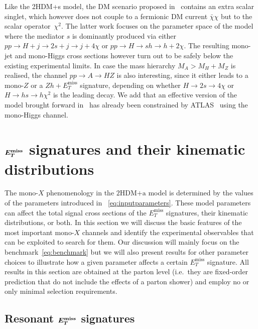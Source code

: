 \documentclass[a4paper, 11pt,notoc]{article}
\newcommand{\MET}{\ensuremath{E_T^\mathrm{miss}}\xspace}
\newcommand{\hdma}{\ensuremath{\textrm{2HDM+a}}\xspace}
\def\bm#1{\mbox{\boldmath$#1$\unboldmath}}
\begin{document}
{\color{blue} Like the 2HDM+s model, the DM scenario proposed in~\cite{vonBuddenbrock:2016rmr} contains an extra scalar singlet, which however does not couple to a fermionic DM current $\bar \chi \chi$ but to the scalar operator~$\chi^2$.} The latter work focuses on the parameter space of the model where the mediator $s$ is dominantly produced via either  $pp \to H + j \to 2s + j \to j + 4 \chi$ or $pp \to H \to sh \to h + 2\chi$. The resulting mono-jet and mono-Higgs cross sections however turn out to be safely below the existing experimental limits. In case the mass hierarchy  $M_A > M_H + M_Z$ is realised, the channel $pp \to A \to HZ$ is also interesting, since it either leads to a mono-$Z$ or a $Zh+\MET$ signature, depending on whether $H \to 2 s \to 4 \chi$ or $H \to h s \to h \chi^2$ is the leading decay. We add that an effective version of the model brought forward in~\cite{vonBuddenbrock:2016rmr}  has already been constrained by ATLAS~\cite{Aaboud:2017uak} using the mono-Higgs channel.  


\section{$\bm{E_T^{\rm miss}}$ signatures and their kinematic distributions}
\label{sec:experimentbasics}

The mono-$X$ phenomenology in the  \hdma model is determined by the values of the parameters introduced in ~\eqref{eq:inputparameters}. These model parameters can affect the total signal cross sections of the $\MET$ signatures, their kinematic distributions, or both. In this section we will discuss the basic features of the most important mono-$X$ channels and identify the experimental observables that can be exploited to search for them. Our discussion will  mainly focus on the benchmark~\eqref{eq:benchmark} but we will also present results for other parameter choices to illustrate how a given parameter affects a certain $\MET$ signature.  All results in this section are obtained at the parton level (i.e.~they are fixed-order prediction that do not include the effects of a parton shower) and employ no or only minimal selection requirements.

\subsection[Resonant $E_T^{\rm miss}$ signatures]{Resonant $\bm{E_T^{\rm miss}}$ signatures}
\label{sec:resonant}
\end{document}
